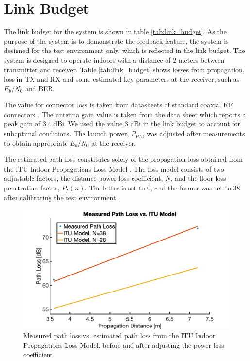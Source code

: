\section{Link Budget}
\label{sec:link_budget}
The link budget for the system is shown in table \ref{tab:link_budget}. As the purpose of the system is to demonstrate the feedback feature, the system is designed for the test environment only, which is reflected in the link budget. The system is designed to operate indoors with a distance of 2 meters between transmitter and receiver. Table \ref{tab:link_budget} shows losses from propagation, loss in TX and RX and some estimated key parameters at the receiver, such as $E_b/N_0$ and BER. 



The value for connector loss is taken from datasheets of standard coaxial RF connectors \cite{rfconnector}. The antenna gain value is taken from the data sheet \cite{antenna} which reports a peak gain of 3.4 dBi. We used the value 3 dBi in the link budget to account for suboptimal conditions. The launch power, $P_{PA}$, was adjusted after measurements to obtain appropriate $E_b/N_0$ at the receiver.

The estimated path loss constitutes solely of the propagation loss obtained from the ITU Indoor Propagations Loss Model \cite{itu_model}. The loss model consists of two adjustable factors, the distance power loss coefficient, $N$, and the floor loss penetration factor, $P_f(n)$. The latter is set to 0, and the former was set to 38 after calibrating the test environment. 

\begin{figure}[htbp]
\begin{center}
\includegraphics[width=\figW\linewidth]{PathLoss.png}
\caption{Measured path loss vs. estimated path loss from the ITU Indoor Propagations Loss Model, before and after adjusting the power loss coefficient}
\label{fig:path_loss}
\end{center}
\end{figure}


